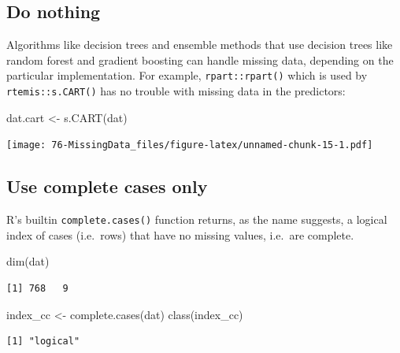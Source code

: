 \documentclass[
]{book}
\newenvironment{Shaded}{\begin{snugshade}}{\end{snugshade}}
\newcommand{\FunctionTok}[1]{\textcolor[rgb]{0.00,0.00,0.00}{#1}}
\newcommand{\NormalTok}[1]{#1}
\newcommand{\OtherTok}[1]{\textcolor[rgb]{0.56,0.35,0.01}{#1}}
\begin{document}
\hypertarget{do-nothing}{%
\subsection{Do nothing}\label{do-nothing}}

Algorithms like decision trees and ensemble methods that use decision trees like random forest and gradient boosting can handle missing data, depending on the particular implementation. For example, \texttt{rpart::rpart()} which is used by \texttt{rtemis::s.CART()} has no trouble with missing data in the predictors:

\begin{Shaded}
\begin{Highlighting}[]
\NormalTok{dat.cart }\OtherTok{\textless{}{-}} \FunctionTok{s.CART}\NormalTok{(dat)}
\end{Highlighting}
\end{Shaded}

\texttt{[image: 76-MissingData\_files/figure-latex/unnamed-chunk-15-1.pdf]}

\hypertarget{use-complete-cases-only}{%
\subsection{Use complete cases only}\label{use-complete-cases-only}}

R's builtin \texttt{complete.cases()} function returns, as the name suggests, a logical index of cases (i.e.~rows) that have no missing values, i.e.~are complete.

\begin{Shaded}
\begin{Highlighting}[]
\FunctionTok{dim}\NormalTok{(dat)}
\end{Highlighting}
\end{Shaded}

\begin{verbatim}
[1] 768   9
\end{verbatim}

\begin{Shaded}
\begin{Highlighting}[]
\NormalTok{index\_cc }\OtherTok{\textless{}{-}} \FunctionTok{complete.cases}\NormalTok{(dat)}
\FunctionTok{class}\NormalTok{(index\_cc)}
\end{Highlighting}
\end{Shaded}

\begin{verbatim}
[1] "logical"
\end{verbatim}
\end{document}
